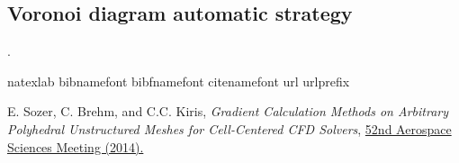 \documentclass[]{article}
\begin{document}
\subsection*{Voronoi diagram automatic strategy}
.
\begin{thebibliography}{19}

\expandafter\ifx\csname natexlab\endcsname\relax\def\natexlab#1{#1}\fi
\expandafter\ifx\csname bibnamefont\endcsname\relax
  \def\bibnamefont#1{#1}\fi
\expandafter\ifx\csname bibfnamefont\endcsname\relax
  \def\bibfnamefont#1{#1}\fi
\expandafter\ifx\csname citenamefont\endcsname\relax
  \def\citenamefont#1{#1}\fi
\expandafter\ifx\csname url\endcsname\relax
  \def\url#1{\texttt{#1}}\fi
\expandafter\ifx\csname urlprefix\endcsname\relax\def\urlprefix{URL }\fi
\providecommand{\bibinfo}[2]{#2}
\providecommand{\eprint}[2][]{\url{#2}}


\bibinfo{author}{\bibfnamefont{E. Sozer}},
\bibinfo{author}{\bibfnamefont{C. Brehm}},
\bibnamefont{and}
\bibinfo{author}{\bibfnamefont{C.C. Kiris}},
\emph{\bibinfo{title}{Gradient Calculation Methods on Arbitrary Polyhedral Unstructured Meshes for Cell-Centered CFD Solvers}},
\href{http://dx.doi.org/10.2514/6.2014-1440}{
\bibinfo{journal}{52nd Aerospace Sciences Meeting} 
(\bibinfo{year}{2014}).}

\end{thebibliography}
\end{document}
